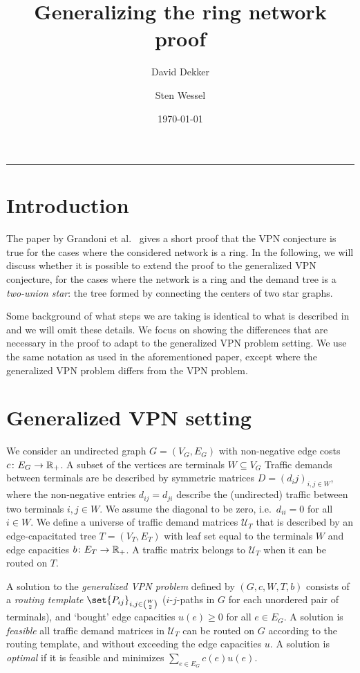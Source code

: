 \documentclass[11pt]{article}
\title{Generalizing the ring network proof}
\author{David Dekker \and Sten Wessel}
\date{\today}
\theoremstyle{definition}
\begin{document}
    \maketitle
    \hrule
    \medskip

    \section{Introduction}
    The paper by Grandoni et al.~\cite{grandoni2008short} gives a short proof that the VPN conjecture is true for the cases where the considered network is a ring.
    In the following, we will discuss whether it is possible to extend the proof to the generalized VPN conjecture, for the cases where the network is a ring and the demand tree is a \emph{two-union star}: the tree formed by connecting the centers of two star graphs.

    Some background of what steps we are taking is identical to what is described in \cite{grandoni2008short} and we will omit these details.
    We focus on showing the differences that are necessary in the proof to adapt to the generalized VPN problem setting.
    We use the same notation as used in the aforementioned paper, except where the generalized VPN problem differs from the VPN problem.

    \section{Generalized VPN setting}
    We consider an undirected graph $G = (V_G, E_G)$ with non-negative edge costs $c\colon E_G \to \mathbb{R}_+$.
    A subset of the vertices are terminals $W \subseteq V_G$
    Traffic demands between terminals are be described by symmetric matrices $D = (d_ij)_{i,j \in W}$, where the non-negative entries $d_{ij} = d_{ji}$ describe the (undirected) traffic between two terminals $i,j \in W$.
    We assume the diagonal to be zero, i.e.\ $d_{ii} = 0$ for all $i \in W$.
    We define a universe of traffic demand matrices $\mathcal U_T$ that is described by an edge-capacitated tree $T = (V_T, E_T)$ with leaf set equal to the terminals $W$ and edge capacities $b\colon E_T \to \mathbb{R}_+$.
    A traffic matrix belongs to $\mathcal U_T$ when it can be routed on $T$.

    A solution to the \emph{generalized VPN problem} defined by $(G, c, W, T, b)$ consists of a \emph{routing template} $\set{P_{ij}}_{i,j \in \binom{W}{2}}$ ($i$-$j$-paths in $G$ for each unordered pair of terminals), and `bought' edge capacities $u(e) \ge 0$ for all $e \in E_G$.
    A solution is \emph{feasible} all traffic demand matrices in $\mathcal U_T$ can be routed on $G$ according to the routing template, and without exceeding the edge capacities $u$.
    A solution is \emph{optimal} if it is feasible and minimizes $\sum_{e \in E_G} c(e) u(e)$.
\end{document}
